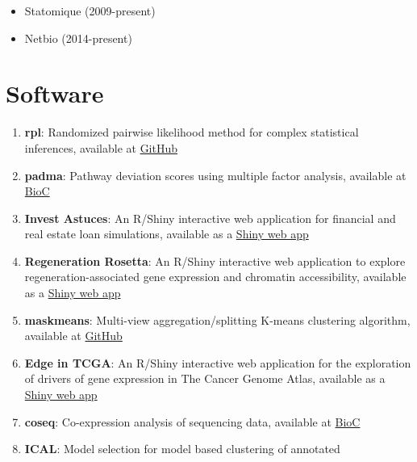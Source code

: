 \documentclass[11pt, a4paper]{awesome-cv}
\providecommand{\tightlist}{%
	\setlength{\itemsep}{0pt}\setlength{\parskip}{0pt}}
\begin{document}
\begin{itemize}
\tightlist
\item
  Statomique (2009-present)
\item
  Netbio (2014-present)
\end{itemize}

\hypertarget{software}{%
\section{Software}\label{software}}

\begin{enumerate}
\def\labelenumi{\arabic{enumi}.}
\tightlist
\item
  \textbf{rpl}: Randomized pairwise likelihood method for complex
  statistical inferences, available at
  \href{https://github.com/andreamrau/rpl}{GitHub}\\
\item
  \textbf{padma}: Pathway deviation scores using multiple factor
  analysis, available at
  \href{https://bioconductor.org/packages/padma/}{BioC}\\
\item
  \textbf{Invest Astuces}: An R/Shiny interactive web application for
  financial and real estate loan simulations, available as a
  \href{https://investastuces.com/simulateurs/}{Shiny web app}\\
\item
  \textbf{Regeneration Rosetta}: An R/Shiny interactive web application
  to explore regeneration-associated gene expression and chromatin
  accessibility, available as a
  \href{http://ls-shiny-prod.uwm.edu/rosetta/}{Shiny web app}\\
\item
  \textbf{maskmeans}: Multi-view aggregation/splitting K-means
  clustering algorithm, available at
  \href{https://github.com/andreamrau/maskmeans}{GitHub}\\
\item
  \textbf{Edge in TCGA}: An R/Shiny interactive web application for the
  exploration of drivers of gene expression in The Cancer Genome Atlas,
  available as a \href{http://ls-shiny-prod.uwm.edu/edge_in_tcga/}{Shiny
  web app}\\
\item
  \textbf{coseq}: Co-expression analysis of sequencing data, available
  at \href{https://bioconductor.org/packages/coseq/}{BioC}\\
\item
  \textbf{ICAL}: Model selection for model based clustering of annotated

\end{enumerate}
\end{document}
